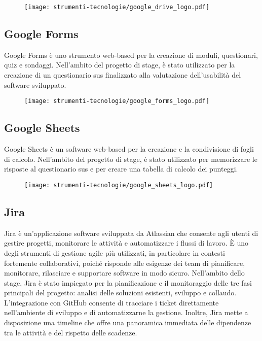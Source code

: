 \begin{figure}[H]
    \centering 
    \texttt{[image: strumenti-tecnologie/google\_drive\_logo.pdf]} 
\end{figure}

\subsection*{Google Forms}

\par Google Forms è uno strumento web-based per la creazione di moduli, questionari, quiz e sondaggi. Nell’ambito del progetto di stage, è stato utilizzato per la creazione di un questionario \gls{sus} finalizzato alla valutazione dell’usabilità del software sviluppato.

\begin{figure}[H]
    \centering 
    \texttt{[image: strumenti-tecnologie/google\_forms\_logo.pdf]} 
\end{figure}

\subsection*{Google Sheets}

\par Google Sheets è un software web-based per la creazione e la condivisione di fogli di calcolo. Nell’ambito del progetto di stage, è stato utilizzato per memorizzare le risposte al questionario \gls{sus} e per creare una tabella di calcolo dei punteggi.

\begin{figure}[H]
    \centering 
    \texttt{[image: strumenti-tecnologie/google\_sheets\_logo.pdf]} 
\end{figure}

\subsection*{Jira}

\par Jira è un'applicazione software sviluppata da Atlassian che consente agli utenti di gestire progetti, monitorare le attività e automatizzare i flussi di lavoro. È uno degli strumenti di gestione agile più utilizzati, in particolare in contesti fortemente collaborativi, poiché risponde alle esigenze dei team di pianificare, monitorare, rilasciare e supportare software in modo sicuro. Nell’ambito dello stage, Jira è stato impiegato per la pianificazione e il monitoraggio delle tre fasi principali del progetto: analisi delle soluzioni esistenti, sviluppo e collaudo. L’integrazione con GitHub consente di tracciare i ticket direttamente nell’ambiente di sviluppo e di automatizzarne la gestione. Inoltre, Jira mette a disposizione una timeline che offre una panoramica immediata delle dipendenze tra le attività e del rispetto delle scadenze.

